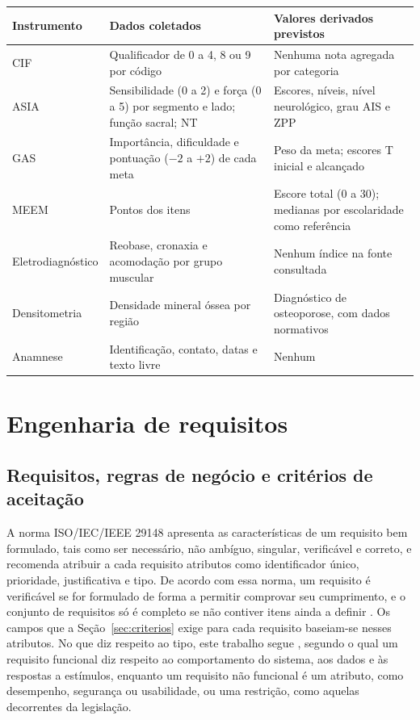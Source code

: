\begin{quadro}[htb]
	\centering
	\caption{Instrumentos de avaliação: dados coletados e valores derivados previstos pela fonte}
	\label{qua:instrumentos}
	\footnotesize
	\begin{tabularx}{\textwidth}{|>{\raggedright\arraybackslash}p{}|>{\raggedright\arraybackslash}X|>{\raggedright\arraybackslash}X|}
		\hline
		Instrumento & Dados coletados & Valores derivados previstos \\ \hline
		CIF & Qualificador de 0 a 4, 8 ou 9 por código & Nenhuma nota agregada por categoria \\ \hline
		ASIA & Sensibilidade (0 a 2) e força (0 a 5) por segmento e lado; função sacral; NT & Escores, níveis, nível
			neurológico, grau AIS e ZPP \\ \hline
		GAS & Importância, dificuldade e pontuação ($-2$ a $+2$) de cada meta & Peso da meta; escores T inicial e
			alcançado \\ \hline
		MEEM & Pontos dos itens & Escore total (0 a 30); medianas por escolaridade como referência \\ \hline
		Eletrodiag\-nóstico & Reobase, cronaxia e acomodação por grupo muscular & Nenhum índice na fonte consultada \\ \hline
		Densitometria & Densidade mineral óssea por região & Diagnóstico de osteoporose, com dados normativos \\ \hline
		Anamnese & Identificação, contato, datas e texto livre & Nenhum \\ \hline
	\end{tabularx}
\end{quadro}

\section{Engenharia de requisitos}
\label{sec:ref-requisitos}

\subsection{Requisitos, regras de negócio e critérios de aceitação}
\label{sec:ref-req-conceitos}

A norma ISO/IEC/IEEE 29148 apresenta as características de um requisito bem formulado, tais como ser necessário, não
ambíguo, singular, verificável e correto, e recomenda atribuir a cada requisito atributos como identificador único,
prioridade, justificativa e tipo. De acordo com essa norma, um requisito é verificável se for formulado de forma a
permitir comprovar seu cumprimento, e o conjunto de requisitos só é completo se não contiver itens ainda a definir
\cite[p.~12--15]{iso29148:2018}. Os campos que a Seção~\ref{sec:criterios} exige para cada requisito baseiam-se
nesses atributos. No que diz respeito ao tipo, este trabalho segue ,
segundo o qual um requisito funcional diz respeito ao comportamento do sistema, aos dados e às respostas a estímulos,
enquanto um requisito não funcional é um atributo, como desempenho, segurança ou usabilidade, ou uma restrição, como
aquelas decorrentes da legislação.

